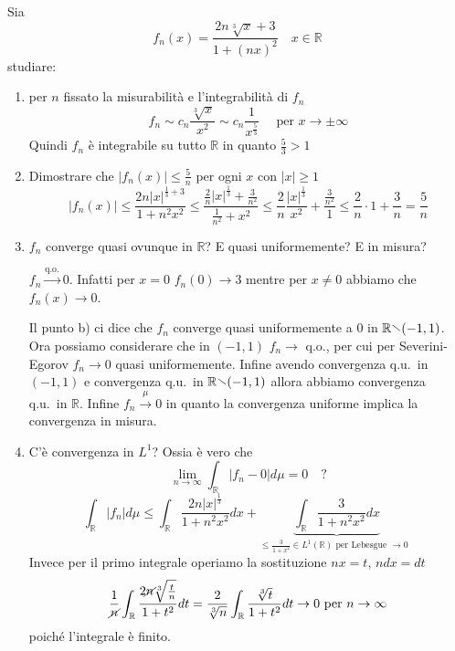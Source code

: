 \begin{eser}
    Sia
    \[
        f_{n}(x) = \frac{2 n \sqrt[3]{x} + 3}{1 + {(nx)}^2} \quad x \in \mathbb{R}
    \]
    studiare:
\begin{enumerate}[label = \alph*)]
    \item per \(n\) fissato la misurabilità e l'integrabilità di \(f_{n}\)
        \[
            f_{n} \sim c_{n} \frac{\sqrt[3]{x}}{x^2} \sim c_{n}
            \frac{1}{x^{\frac{5}{3}}} \quad \text{ per } x \to \pm\infty
        \]
        Quindi \(f_{n}\) è integrabile su tutto \(\mathbb{R}\) in quanto
        \(\frac{5}{3} > 1\) 
    \item Dimostrare che \(|f_{n}(x)| \le \frac{5}{n}\) per ogni \(x\) con \(|x|
        \ge 1\) 
        \[
            |f_{n}(x)| \le \frac{2 n |x|^{\frac{1}{3} + 3}}{1 + n^2x^2} \le
            \frac{\frac{2}{n}|x|^{\frac{1}{3}} + \frac{3}{n^2}}{\frac{1}{n^2} +
            x^2} \le \frac{2}{n} \frac{|x|^{\frac{1}{3}}}{x^2} +
            \frac{\frac{3}{n^2}}{1} \le \frac{2}{n}\cdot 1 + \frac{3}{n} =
            \frac{5}{n}
        \]
    \item \(f_{n}\) converge quasi ovunque in \(\mathbb{R}\)? E quasi
        uniformemente? E in misura?

        \(f_{n} \overset{\text{q.o.}}{\to} 0\). Infatti per \(x = 0\)
        \(f_{n}(0) \to 3\) mentre per \(x \neq 0\) abbiamo che \(f_{n}(x) \to
        0\).

        Il punto b) ci dice che \(f_{n}\) converge quasi uniformemente a 0 in
        \(\mathbb{R} \sminus (-1, 1)\).
        Ora possiamo considerare che in
        \((-1,1)\) \(f_{n} \to \) q.o., per cui per Severini-Egorov \(f_{n} \to
        0\) quasi uniformemente.
        Infine avendo convergenza q.u.~in \((-1,1)\) e convergenza
        q.u.~in \(\mathbb{R}\sminus (-1,1)\) allora abbiamo convergenza q.u.~in
         \(\mathbb{R}\). 
        Infine \(f_{n} \overset{\mu}{\to} 0\) in quanto la convergenza uniforme
        implica la convergenza in misura.
    \item C'è convergenza in \(L^{1}\)? Ossia è vero che
      \[
            \lim_{n \to \infty} \int_{\mathbb{R}} |f_{n} - 0| d\mu = 0 \quad ?
        \]
       \[
           \int_{\mathbb{R}} |f_{n}| d\mu \le  \int_{\mathbb{R}} \frac{2n
           |x|^{\frac{1}{3}}}{1 + n^2x^2} dx + \underbrace{\int_{\mathbb{R}}\frac{3}{1 +
       n^2x^2}dx}_{\le \frac{3}{1+x^2} \in L^{1}(\mathbb{R})\text{ per Lebesgue
       \(\to 0\) }}
       \] 
       Invece per il primo integrale operiamo la sostituzione \(nx = t\), \(ndx
       = dt\) 
       \[
           \frac{1}{\cancel{n}}\int_{\mathbb{R}} \frac{2\cancel{n}
           \sqrt[3]{\frac{t}{n}}}{1+t^2} dt = \frac{2}{\sqrt[3]{n}}
           \int_{\mathbb{R}} \frac{\sqrt[3]{t} }{1+t^2} dt \to 0 \text{ per
           $n\to \infty$}
       \]
       poiché l'integrale è finito.

\end{enumerate}
\end{eser}

